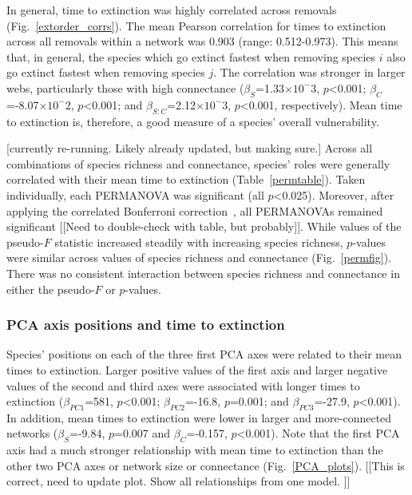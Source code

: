 \documentclass[12pt]{article}
\begin{document}
		In general, time to extinction was highly correlated across removals (Fig.~\ref{extorder_corrs}). The mean Pearson correlation for times to extinction across all removals within a network was 0.903 (range: 0.512-0.973). This means that, in general, the species which go extinct fastest when removing species $i$ also go extinct fastest when removing species $j$. The correlation was stronger in larger webs, particularly those with high connectance ($\beta_{S}$=1.33$\times10^-3$, $p$\textless0.001; $\beta_{C}$=-8.07$\times10^-2$, $p$\textless0.001; and $\beta_{S:C}$=2.12$\times10^-3$, $p$\textless0.001, respectively). Mean time to extinction is, therefore, a good measure of a species' overall vulnerability.


		[currently re-running. Likely already updated, but making sure.]
		Across all combinations of species richness and connectance, species' roles were generally correlated with their mean time to extinction (Table~\ref{permtable}). Taken individually, each PERMANOVA was significant (all $p$\textless0.025). Moreover, after applying the correlated Bonferroni correction~\citep{Drezner2016}, all PERMANOVAs remained significant [[Need to double-check with table, but probably]]. While values of the pseudo-$F$ statistic increased steadily with increasing species richness, $p$-values were similar across values of species richness and connectance (Fig.~\ref{permfig}). There was no consistent interaction between species richness and connectance in either the pseudo-$F$ or $p$-values.


		

		\subsubsection*{PCA axis positions and time to extinction}

			Species' positions on each of the three first PCA axes were related to their mean times to extinction. Larger positive values of the first axis and larger negative values of the second and third axes were associated with longer times to extinction ($\beta_{PC1}$=581, $p$\textless0.001; $\beta_{PC2}$=-16.8, $p$=0.001; and $\beta_{PC3}$=-27.9, $p$\textless0.001). In addition, mean times to extinction were lower in larger and more-connected networks ($\beta_{S}$=-9.84, $p$=0.007 and $\beta_{C}$=-0.157, $p$\textless0.001). Note that the first PCA axis had a much stronger relationship with mean time to extinction than the other two PCA axes or network size or connectance (Fig.~\ref{PCA_plots}).
			[[This is correct, need to update plot. Show all relationships from one model. ]]
\end{document}
